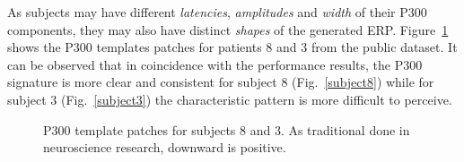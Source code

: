 \documentclass[entropy,article,submit,moreauthors,pdftex,10pt,a4paper]{mdpi}
\begin{document}
As subjects may have different \textit{latencies}, \textit{amplitudes} and \textit{width} of their P300 components, they may also have distinct \textit{shapes} of the generated ERP.  Figure~\ref{fig:p300templates} shows the P300 templates patches for patients 8 and 3 from the public dataset. It can be observed that in coincidence with the performance results, the P300 signature is more clear and consistent for subject 8 (Fig.~\ref{subject8})  while for subject 3 (Fig.~\ref{subject3}) the characteristic pattern is more difficult to perceive.

\begin{figure}[H]
\centering
{}
\caption{P300 template patches for subjects 8 and 3. As traditional done in neuroscience research, downward is positive. }
\label{fig:p300templates}
\end{figure}



\end{document}
